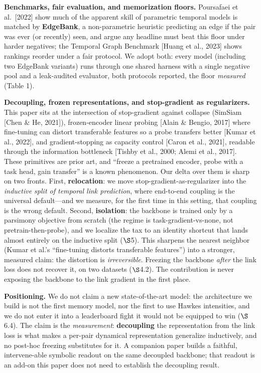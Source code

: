 \documentclass[conference]{IEEEtran}
\begin{document}
\textbf{Benchmarks, fair evaluation, and memorization floors.} Poursafaei et al.~[2022] show much of the apparent skill of parametric temporal models is matched by \textbf{EdgeBank}, a non-parametric heuristic predicting an edge if the pair was ever (or recently) seen, and argue any headline must beat this floor under harder negatives; the Temporal Graph Benchmark [Huang et al., 2023] shows rankings reorder under a fair protocol. We adopt both: every model (including two EdgeBank variants) runs through one shared harness with a single negative pool and a leak-audited evaluator, both protocols reported, the floor \emph{measured} (Table 1).

\textbf{Decoupling, frozen representations, and stop-gradient as regularizers.} This paper sits at the intersection of stop-gradient against collapse (SimSiam [Chen \& He, 2021]), frozen-encoder linear probing [Alain \& Bengio, 2017] where fine-tuning can distort transferable features so a probe transfers better [Kumar et al., 2022], and gradient-stopping as capacity control [Caron et al., 2021], readable through the information bottleneck [Tishby et al., 2000; Alemi et al., 2017]. These primitives are prior art, and ``freeze a pretrained encoder, probe with a task head, gain transfer'' is a known phenomenon. Our delta over them is sharp on two fronts. First, \textbf{relocation}: we move stop-gradient-as-regularizer into the \emph{inductive split of temporal link prediction}, where end-to-end coupling is the universal default---and we measure, for the first time in this setting, that coupling is the wrong default. Second, \textbf{isolation}: the backbone is trained only by a parsimony objective from scratch (the regime is task-gradient-vs-none, not pretrain-then-probe), and we localize the tax to an identity shortcut that lands almost entirely on the inductive split ($\S$5). This sharpens the nearest neighbor (Kumar et al.'s ``fine-tuning distorts transferable features'') into a stronger, measured claim: the distortion is \emph{irreversible}. Freezing the backbone \emph{after} the link loss does not recover it, on two datasets ($\S$4.2). The contribution is never exposing the backbone to the link gradient in the first place.

\textbf{Positioning.} We do not claim a new state-of-the-art model: the architecture we build is not the first memory model, nor the first to use Hawkes intensities, and we do not enter it into a leaderboard fight it would not be equipped to win ($\S$6.4). The claim is the \emph{measurement}: \textbf{decoupling} the representation from the link loss is what makes a per-pair dynamical representation generalize inductively, and no post-hoc freezing substitutes for it. A companion paper builds a faithful, intervene-able symbolic readout on the same decoupled backbone; that readout is an add-on this paper does not need to establish the decoupling result.
\end{document}
